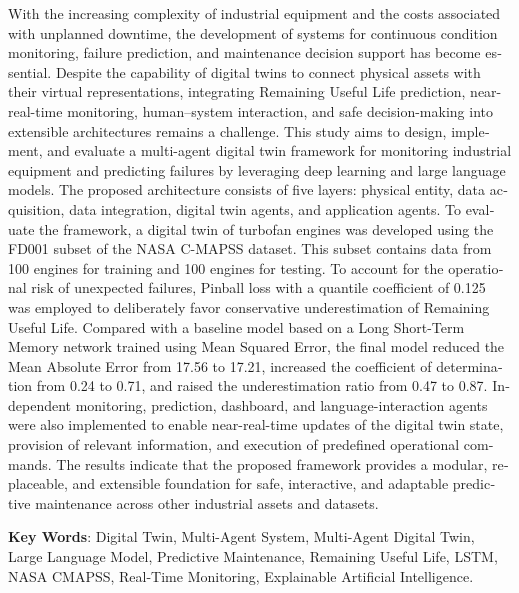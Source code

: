 \documentclass[a4paper,fleqn]{report}
\begin{document}
\begin{latin}
\begin{small}
With the increasing complexity of industrial equipment and the costs associated with unplanned downtime, the development of systems for continuous condition monitoring, failure prediction, and maintenance decision support has become essential. Despite the capability of digital twins to connect physical assets with their virtual representations, integrating Remaining Useful Life prediction, near-real-time monitoring, human--system interaction, and safe decision-making into extensible architectures remains a challenge. This study aims to design, implement, and evaluate a multi-agent digital twin framework for monitoring industrial equipment and predicting failures by leveraging deep learning and large language models. The proposed architecture consists of five layers: physical entity, data acquisition, data integration, digital twin agents, and application agents. To evaluate the framework, a digital twin of turbofan engines was developed using the FD001 subset of the NASA C-MAPSS dataset. This subset contains data from 100 engines for training and 100 engines for testing. To account for the operational risk of unexpected failures, Pinball loss with a quantile coefficient of 0.125 was employed to deliberately favor conservative underestimation of Remaining Useful Life. Compared with a baseline model based on a Long Short-Term Memory network trained using Mean Squared Error, the final model reduced the Mean Absolute Error from 17.56 to 17.21, increased the coefficient of determination from 0.24 to 0.71, and raised the underestimation ratio from 0.47 to 0.87. Independent monitoring, prediction, dashboard, and language-interaction agents were also implemented to enable near-real-time updates of the digital twin state, provision of relevant information, and execution of predefined operational commands. The results indicate that the proposed framework provides a modular, replaceable, and extensible foundation for safe, interactive, and adaptable predictive maintenance across other industrial assets and datasets.


\end{small}

\vspace{0.5 cm}

\noindent \textbf{Key Words}: Digital Twin, Multi-Agent System, Multi-Agent Digital Twin, Large Language Model, Predictive Maintenance, Remaining Useful Life, LSTM, NASA CMAPSS, Real-Time Monitoring, Explainable Artificial Intelligence.

\end{latin}
\end{document}
